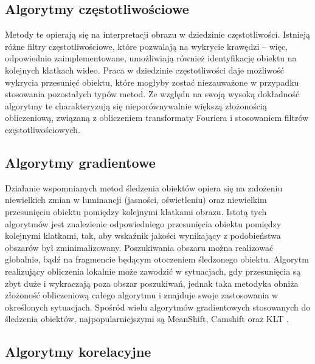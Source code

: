 \subsection{Algorytmy częstotliwościowe}

Metody te opierają się na interpretacji obrazu w dziedzinie częstotliwości. 
Istnieją różne filtry częstotliwościowe, które pozwalają na wykrycie krawędzi -- więc, odpowiednio zaimplementowane, umożliwiają również identyfikację obiektu na kolejnych klatkach wideo. 
Praca w dziedzinie częstotliwości daje możliwość wykrycia przesunięć obiektu, które mogłyby zostać niezauważone w przypadku stosowania pozostałych typów metod. 
Ze względu na swoją wysoką dokładność algorytmy te charakteryzują się nieporównywalnie większą złożonością obliczeniową, związaną z obliczeniem transformaty Fouriera i stosowaniem filtrów częstotliwościowych. %

\subsection{Algorytmy gradientowe}

Działanie wspomnianych metod śledzenia obiektów opiera się na założeniu niewielkich zmian w luminancji (jasności, oświetleniu) oraz niewielkim przesunięciu obiektu pomiędzy kolejnymi klatkami obrazu. 
Istotą tych algorytmów jest znalezienie odpowiedniego przesunięcia obiektu pomiędzy kolejnymi klatkami, tak, aby wskaźnik jakości wynikający z podobieństwa obszarów był zminimalizowany. 
Poszukiwania obszaru można realizować globalnie, bądź na fragmencie będącym otoczeniem śledzonego obiektu. 
Algorytm realizujący obliczenia lokalnie może zawodzić w sytuacjach, gdy przesunięcia są zbyt duże i wykraczają poza obszar poszukiwań, jednak taka metodyka obniża złożoność obliczeniową całego algorytmu i znajduje swoje zastosowania w określonych sytuacjach.
Spośród wielu algorytmów gradientowych stosowanych do śledzenia obiektów, najpopularniejszymi są MeanShift, Camshift oraz KLT \cite{GradientMethods}.  %

\subsection{Algorytmy korelacyjne}


